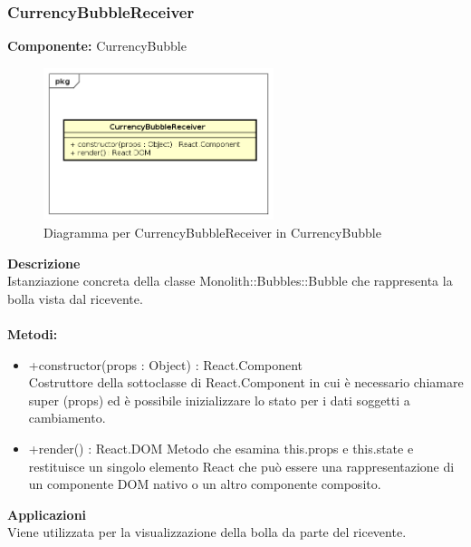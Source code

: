 \clearpage

\subsubsection{CurrencyBubbleReceiver}
\textbf{Componente:}  CurrencyBubble\\
   \FloatBarrier
   \begin{figure}[ht]
   \centering
   \includegraphics[width=0.6\textwidth]{img/single-CurrencyBubbleReceiver}
   \caption{{Diagramma per CurrencyBubbleReceiver in CurrencyBubble}}
\end{figure}
\FloatBarrier
\textbf{Descrizione}\\
Istanziazione concreta della classe Monolith::Bubbles::Bubble che rappresenta la bolla vista dal ricevente.
\\
\\
\textbf{Metodi:} 
\begin{itemize}
\item +constructor(props : Object) : React.Component 
\\
Costruttore della sottoclasse di React.Component in cui è necessario chiamare super (props) ed è possibile inizializzare lo stato per i dati soggetti a cambiamento.

\item +render() : React.DOM
Metodo che esamina this.props e this.state e restituisce un singolo elemento React che può essere una rappresentazione di un componente DOM nativo o un altro componente composito.

\end{itemize} 


\textbf{Applicazioni}\\
Viene utilizzata per la visualizzazione della bolla da parte del ricevente. 


\clearpage


